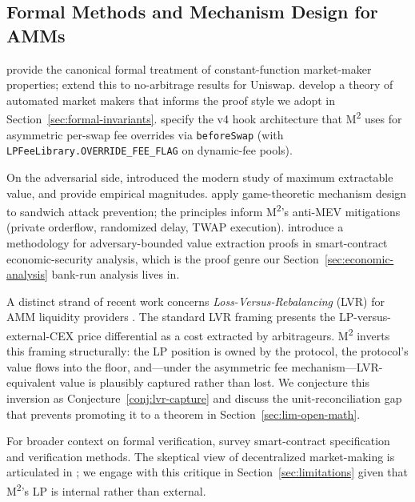 \subsection{Formal Methods and Mechanism Design for AMMs}
\label{sec:related-formal}

\citet{Angeris2020} provide the canonical formal treatment of constant-function market-maker properties; \citet{Angeris2021} extend this to no-arbitrage results for Uniswap. \citet{Bartoletti2021} develop a theory of automated market makers that informs the proof style we adopt in Section~\ref{sec:formal-invariants}. \citet{UniswapV4} specify the v4 hook architecture that M\textsuperscript{2} uses for asymmetric per-swap fee overrides via \texttt{beforeSwap} (with \texttt{LPFeeLibrary.OVERRIDE\_FEE\_FLAG} on dynamic-fee pools).

On the adversarial side, \citet{Daian2020} introduced the modern study of maximum extractable value, and \citet{Qin2022} provide empirical magnitudes. \citet{HeimbachWattenhofer2022} apply game-theoretic mechanism design to sandwich attack prevention; the principles inform M\textsuperscript{2}'s anti-MEV mitigations (private orderflow, randomized delay, TWAP execution). \citet{Babel2023} introduce a methodology for adversary-bounded value extraction proofs in smart-contract economic-security analysis, which is the proof genre our Section~\ref{sec:economic-analysis} bank-run analysis lives in.

A distinct strand of recent work concerns \emph{Loss-Versus-Rebalancing} (LVR) for AMM liquidity providers \citep{MilionisMoallemiRoughgarden2023}. The standard LVR framing presents the LP-versus-external-CEX price differential as a cost extracted by arbitrageurs. M\textsuperscript{2} inverts this framing structurally: the LP position is owned by the protocol, the protocol's value flows into the floor, and---under the asymmetric fee mechanism---LVR-equivalent value is plausibly captured rather than lost. We conjecture this inversion as Conjecture~\ref{conj:lvr-capture} and discuss the unit-reconciliation gap that prevents promoting it to a theorem in Section~\ref{sec:lim-open-math}.

For broader context on formal verification, \citet{Tolmach2022} survey smart-contract specification and verification methods. The skeptical view of decentralized market-making is articulated in \citet{Park2023}; we engage with this critique in Section~\ref{sec:limitations} given that M\textsuperscript{2}'s LP is internal rather than external.


